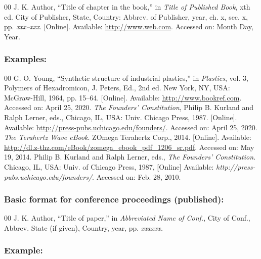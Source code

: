 \documentclass{ieeeojpel}
\begin{document}
\begin{thebibliography}{00}
 J. K. Author, ``Title of chapter in the book,'' in \textit{Title of Published Book}, xth ed. City of
Publisher, State, Country: Abbrev. of Publisher, year, ch. x, sec. x, pp.
\textit{xxx--xxx}. [Online]. Available: \underline {http://www.web.com}. Accessed on: Month
Day, Year.
\end{thebibliography}

\subsubsection*{Examples:}

\begin{thebibliography}{00}
 G. O. Young, ``Synthetic structure of industrial
plastics,'' in \emph{Plastics}, vol. 3, Polymers of Hexadromicon, J.
Peters, Ed., 2nd ed. New York, NY, USA: McGraw-Hill, 1964, pp. 15--64.
[Online]. Available: \underline{http://www.bookref.com}. Accessed on: April 25, 2020.
 \textit{The Founders' Constitution}, Philip B. Kurland and Ralph Lerner, eds., Chicago, IL, USA: Univ. Chicago Press, 1987. [Online]. Available: \underline {http://press-pubs.uchicago.edu/founders/}. Accessed on: April 25, 2020.
 \emph{The Terahertz Wave eBook}. ZOmega Terahertz
Corp., 2014. [Online]. Available: \underline{http://dl.z-thz.com/eBook/zomega\_ebook\_pdf\_1206\_sr.pdf}. Accessed on: May 19, 2014.
 Philip B. Kurland and Ralph Lerner, eds., \textit{The
Founders' Constitution. }Chicago, IL, USA: Univ. of Chicago Press, 1987, [Online] Available: \emph{http://press-pubs.uchicago.edu/founders/}. Accessed on: Feb. 28, 2010.
\end{thebibliography}

\subsubsection*{Basic format for conference proceedings (published):}

\begin{thebibliography}{00}
 J. K. Author, ``Title of paper,'' in \textit{Abbreviated Name of Conf.}, City of Conf., Abbrev. State (if
given), Country, year, pp. \textit{xxxxxx.}
\end{thebibliography}

\subsubsection*{Example:}
\end{document}
